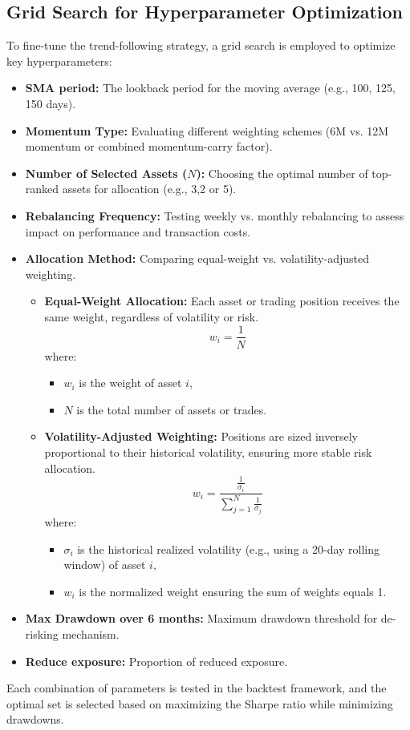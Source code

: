 \documentclass[11pt, oneside, a4paper, titlepage]{report}
\begin{document}
\subsection{Grid Search for Hyperparameter Optimization}
To fine-tune the trend-following strategy, a grid search is employed to optimize key hyperparameters:
\begin{itemize}
    \item 	\textbf{SMA period:} The lookback period for the moving average (e.g., 100, 125, 150 days).
    \item 	\textbf{Momentum Type:} Evaluating different weighting schemes (6M vs. 12M momentum or combined momentum-carry factor).
    \item 	\textbf{Number of Selected Assets ($N$):} Choosing the optimal number of top-ranked assets for allocation (e.g., 3,2 or 5).
    \item 	\textbf{Rebalancing Frequency:} Testing weekly vs. monthly rebalancing to assess impact on performance and transaction costs.
\item \textbf{Allocation Method:} Comparing equal-weight vs. volatility-adjusted weighting.

\begin{itemize}
    \item \textbf{Equal-Weight Allocation:} Each asset or trading position receives the same weight, regardless of volatility or risk.
    \begin{equation}
        w_i = \frac{1}{N}
    \end{equation}
    where:
    \begin{itemize}
        \item $w_i$ is the weight of asset $i$,
        \item $N$ is the total number of assets or trades.
    \end{itemize}

    \item \textbf{Volatility-Adjusted Weighting:} Positions are sized inversely proportional to their historical volatility, ensuring more stable risk allocation.
    \begin{equation}
        w_i = \frac{\frac{1}{\sigma_i}}{\sum_{j=1}^{N} \frac{1}{\sigma_j}}
    \end{equation}
    where:
    \begin{itemize}
        \item $\sigma_i$ is the historical realized volatility (e.g., using a 20-day rolling window) of asset $i$,
        \item $w_i$ is the normalized weight ensuring the sum of weights equals 1.
    \end{itemize}
\end{itemize}
    \item 	\textbf{Max Drawdown over 6 months:} Maximum drawdown threshold for de-risking mechanism.
    \item 	\textbf{Reduce exposure:} Proportion of reduced exposure.

\end{itemize}
Each combination of parameters is tested in the backtest framework, and the optimal set is selected based on maximizing the Sharpe ratio while minimizing drawdowns. 
\end{document}
